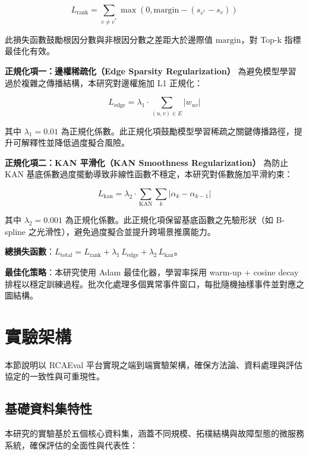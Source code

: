 \documentclass[10pt,a4paper,twocolumn]{article}
\begin{document}
\begin{equation}
L_{\text{rank}} = \sum_{v \neq v^*} \max(0, \text{margin} - (s_{v^*} - s_v))
\end{equation}

此損失函數鼓勵根因分數與非根因分數之差距大於邊際值 $\text{margin}$，對 Top-k 指標最佳化有效。

\textbf{正規化項一：邊權稀疏化（Edge Sparsity Regularization）}  
為避免模型學習過於複雜之傳播結構，本研究對邊權施加 L1 正規化：

\begin{equation}
L_{\text{edge}} = \lambda_1 \cdot \sum_{(u,v)\in E} |w_{uv}|
\end{equation}

其中 $\lambda_1=0.01$ 為正規化係數。此正規化項鼓勵模型學習稀疏之關鍵傳播路徑，提升可解釋性並降低過度擬合風險。

\textbf{正規化項二：KAN 平滑化（KAN Smoothness Regularization）}  
為防止 KAN 基底係數過度擺動導致非線性函數不穩定，本研究對係數施加平滑約束：

\begin{equation}
L_{\text{kan}} = \lambda_2 \cdot \sum_{\text{KAN}} \sum_k |\alpha_k - \alpha_{k-1}|
\end{equation}

其中 $\lambda_2=0.001$ 為正規化係數。此正規化項保留基底函數之先驗形狀（如 B-spline 之光滑性），避免過度擬合並提升跨場景推廣能力。

\textbf{總損失函數}：$L_{\text{total}} = L_{\text{rank}} + \lambda_1 \, L_{\text{edge}} + \lambda_2 \, L_{\text{kan}}$。

\textbf{最佳化策略}：本研究使用 Adam 最佳化器，學習率採用 warm-up + cosine decay 排程以穩定訓練過程。批次化處理多個異常事件窗口，每批隨機抽樣事件並對應之圖結構。

\section{實驗架構}

本節說明以 RCAEval 平台實現之端到端實驗架構，確保方法論、資料處理與評估協定的一致性與可重現性。

\subsection{基礎資料集特性}

本研究的實驗基於五個核心資料集，涵蓋不同規模、拓樸結構與故障型態的微服務系統，確保評估的全面性與代表性：
\end{document}
